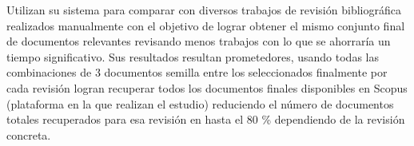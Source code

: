 Utilizan su sistema para comparar con diversos trabajos de revisión bibliográfica realizados manualmente con el objetivo de lograr obtener el mismo conjunto final de documentos relevantes revisando menos trabajos con lo que se ahorraría un tiempo significativo. Sus resultados resultan prometedores, usando todas las combinaciones de 3 documentos semilla entre los seleccionados finalmente por cada revisión logran recuperar todos los documentos finales disponibles en Scopus (plataforma en la que realizan el estudio) reduciendo el número de documentos totales recuperados para esa revisión en hasta el 80 \% dependiendo de la revisión concreta.




